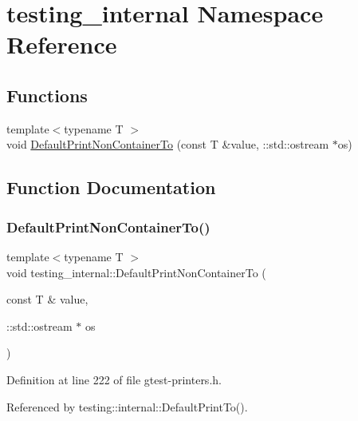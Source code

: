 \hypertarget{namespacetesting__internal}{}\section{testing\+\_\+internal Namespace Reference}
\label{namespacetesting__internal}
\subsection*{Functions}
\begin{DoxyCompactItemize}
\item 
{\footnotesize template$<$typename T $>$ }\\void \hyperlink{namespacetesting__internal_a3f49d3d0c996242f9d383c850097a656}{Default\+Print\+Non\+Container\+To} (const T \&value, \+::std\+::ostream $\ast$os)
\end{DoxyCompactItemize}


\subsection{Function Documentation}
\mbox{\label{namespacetesting__internal_a3f49d3d0c996242f9d383c850097a656}} 
\subsubsection{\texorpdfstring{Default\+Print\+Non\+Container\+To()}{DefaultPrintNonContainerTo()}}
{\footnotesize\ttfamily template$<$typename T $>$ \\
void testing\+\_\+internal\+::\+Default\+Print\+Non\+Container\+To (\begin{DoxyParamCaption}\item[{const T \&}]{value,  }\item[{\+::std\+::ostream $\ast$}]{os }\end{DoxyParamCaption})}



Definition at line 222 of file gtest-\/printers.\+h.



Referenced by testing\+::internal\+::\+Default\+Print\+To().


